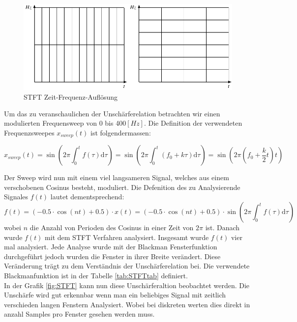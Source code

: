 \begin{figure}[!ht]
	\centering
	\includegraphics[width=0.7\linewidth]{papers/autotune/sections/fft/images/windows.pdf}
	\caption{STFT Zeit-Frequenz-Auflösung}\label{fig:stftauf}	
\end{figure}





 
Um das zu veranschaulichen  der Unschärferelation betrachten wir einen modulierten Frequensweep von 0 bis 400$[Hz]$. Die Definition der verwendeten Frequenzsweepes $x_{sweep}(t)$ ist folgendermassen:

\begin{equation}
x_{sweep}(t)=\sin \left(2 \pi \int_{0}^{t} f(\tau) \mathrm{d} \tau\right)=\sin \left(2 \pi \int_{0}^{t}\left(f_{0}+k \tau\right) \mathrm{d} \tau\right)=\sin \left(2 \pi\left(f_{0}+\frac{k}{2} t\right) t\right)
\end{equation} 

Der Sweep wird nun mit einem viel langsameren Signal, welches aus einem verschobenen Cosinus besteht, moduliert. Die Defenition des zu Analysierende Signales $f(t)$ lautet dementsprechend:
\begin{equation}
f(t)= (-0.5\cdot \cos(nt)+0.5)\cdot x(t)=(-0.5\cdot \cos(nt)+0.5)\cdot \sin \left(2 \pi \int_{0}^{t} f(\tau) \mathrm{d} \tau\right)
\end{equation} \label{eq:sin-sweep}
wobei $n$ die Anzahl von Perioden des Cosinus in einer Zeit von $2\pi$ ist. Danach wurde $f(t)$ mit dem STFT Verfahren analysiert. Insgesamt wurde $f(t)$ vier mal analysiert. Jede Analyse wurde mit der Blackman Fensterfunktion durchgeführt jedoch wurden die Fenster in ihrer Breite verändert. Diese Veränderung trägt zu dem Verständnis der Unschärferelation bei. Die verwendete Blackmanfunktion ist in der Tabelle \ref{tab:STFTtab} definiert.\\

In der Grafik \ref{fig:STFT} kann nun diese Unschärferaltion beobachtet werden. Die Unschärfe wird gut erkennbar wenn man ein beliebiges Signal mit zeitlich verschieden langen Fenstern Analysiert. Wobei bei diskreten werten dies direkt in anzahl Samples pro Fenster gesehen werden muss.\\



